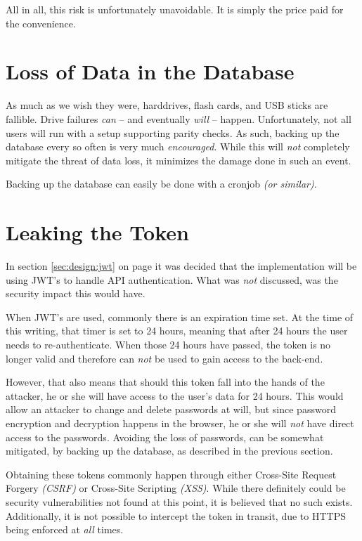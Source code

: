 		All in all, this risk is unfortunately unavoidable. It is simply the price paid for the convenience.
	
	\section{Loss of Data in the Database}
		As much as we wish they were, harddrives, flash cards, and USB sticks are fallible. Drive failures \emph{can} -- and eventually \emph{will} -- happen. Unfortunately, not all users will run with a setup supporting parity checks. As such, backing up the database every so often is very much \emph{encouraged}. While this will \emph{not} completely mitigate the threat of data loss, it minimizes the damage done in such an event.

		Backing up the database can easily be done with a cronjob \emph{(or similar)}.

	\section{Leaking the Token}
		In section \ref{sec:design:jwt} on page \pageref{sec:design:jwt} it was decided that the implementation will be using JWT's to handle API authentication. What was \emph{not} discussed, was the security impact this would have.

		When JWT's are used, commonly there is an expiration time set. At the time of this writing, that timer is set to 24 hours, meaning that after 24 hours the user needs to re-authenticate. When those 24 hours have passed, the token is no longer valid and therefore can \emph{not} be used to gain access to the back-end.

		However, that also means that should this token fall into the hands of the attacker, he or she will have access to the user's data for 24 hours. This would allow an attacker to change and delete passwords at will, but since password encryption and decryption happens in the browser, he or she will \emph{not} have direct access to the passwords. Avoiding the loss of passwords, can be somewhat mitigated, by backing up the database, as described in the previous section.

		Obtaining these tokens commonly happen through either Cross-Site Request Forgery \emph{(CSRF)} or Cross-Site Scripting \emph{(XSS)}. While there definitely could be security vulnerabilities not found at this point, it is believed that no such exists. Additionally, it is not possible to intercept the token in transit, due to HTTPS being enforced at \emph{all} times.

